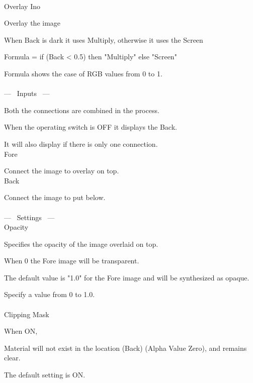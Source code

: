 \documentclass[a4paper,12pt]{article}
\begin{document}
\thispagestyle{empty}

\Large
\noindent \\
Overlay Ino\medskip
\par
\normalsize
Overlay the image\par
When Back is dark it uses Multiply, otherwise it uses the Screen\par
Formula = if (Back < 0.5) then "Multiply" else "Screen"\par
Formula shows the case of RGB values from 0 to 1.\\
\\
--- \ Inputs \ ---\par
Both the connections are combined in the process.\par
When the operating switch is OFF it displays the Back.\par
It will also display if there is only one connection.\\
Fore\par
Connect the image to overlay on top.\\
Back\par
Connect the image to put below.\\
\\
--- \ Settings \ ---\\
Opacity\par
Specifies the opacity of the image overlaid on top.\par
When 0 the Fore image will be transparent.\par
The default value is "1.0" for the Fore image and will be synthesized as opaque.\par
Specify a value from 0 to 1.0.\\
\\
Clipping Mask\par
When ON,\par
Material will not exist in the location (Back) (Alpha Value Zero), and remains clear.\par
The default setting is ON.
\end{document}
